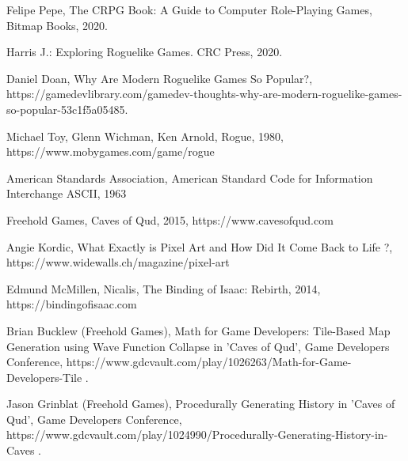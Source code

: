 \documentclass[12pt,twoside]{article}
\begin{document}
\clearpage


\begin{thebibliography}{4}
	

 Felipe Pepe, The CRPG Book: A Guide to Computer Role-Playing Games, Bitmap Books, 2020.

 Harris J.: Exploring Roguelike Games. CRC Press, 2020.

 Daniel Doan, Why Are Modern Roguelike Games So Popular?, https://gamedevlibrary.com/gamedev-thoughts-why-are-modern-roguelike-games-so-popular-53c1f5a05485.

 Michael Toy, Glenn Wichman, Ken Arnold, Rogue, 1980, https://www.mobygames.com/game/rogue

 American Standards Association, American Standard Code for Information Interchange ASCII, 1963

 Freehold Games, Caves of Qud, 2015, https://www.cavesofqud.com

 Angie Kordic, What Exactly is Pixel Art and How Did It Come Back to Life ?, https://www.widewalls.ch/magazine/pixel-art

 Edmund McMillen, Nicalis, The Binding of Isaac: Rebirth, 2014, https://bindingofisaac.com

 Brian Bucklew (Freehold Games), Math for Game Developers: Tile-Based Map Generation using Wave Function Collapse in 'Caves of Qud', Game Developers Conference, https://www.gdcvault.com/play/1026263/Math-for-Game-Developers-Tile .

 Jason Grinblat (Freehold Games), Procedurally Generating History in 'Caves of Qud', Game Developers Conference, https://www.gdcvault.com/play/1024990/Procedurally-Generating-History-in-Caves .


\end{thebibliography}
\end{document}
